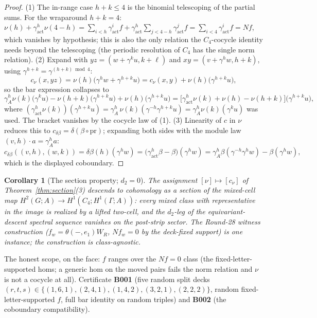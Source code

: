 \documentclass[11pt]{article}
\newtheorem{corollary}[theorem]{Corollary}
\begin{document}
\begin{proof}
(1) The in-range case $h+k\le 4$ is the binomial telescoping of the
partial sums. For the wraparound $h+k=4$:
$\nu(h)+\gamma_{\mathrm{act}}^h\nu(4-h)
=\sum_{i<h}\gamma_{\mathrm{act}}^if+\gamma_{\mathrm{act}}^h
\sum_{j<4-h}\gamma_{\mathrm{act}}^jf
=\sum_{i<4}\gamma_{\mathrm{act}}^if=Nf$, which vanishes by
hypothesis; this is also the only relation the $C_4$-cocycle identity
needs beyond the telescoping (the periodic resolution of $C_4$ has the
single norm relation). (2) Expand with
$yz=(w+\gamma^ku,k+\ell)$ and
$xy=(v+\gamma^hw,h+k)$, using
$\gamma^{h+k}=\gamma^{(h+k)\bmod 4}$:
\[
c_\nu(x,yz)=\nu(h)\bigl(\gamma^h w+\gamma^{h+k}u\bigr)
=c_\nu(x,y)+\nu(h)\bigl(\gamma^{h+k}u\bigr),
\]
so the bar expression collapses to
\[
\gamma_A^h\nu(k)\bigl(\gamma^ku\bigr)
-\nu(h+k)\bigl(\gamma^{h+k}u\bigr)+\nu(h)\bigl(\gamma^{h+k}u\bigr)
=\bigl[\gamma_{\mathrm{act}}^h\nu(k)+\nu(h)-\nu(h+k)\bigr]
\bigl(\gamma^{h+k}u\bigr),
\]
where
$(\gamma_{\mathrm{act}}^h\nu(k))(\gamma^{h+k}u)
=\gamma_A^h\,\nu(k)(\gamma^{-h}\gamma^{h+k}u)
=\gamma_A^h\nu(k)(\gamma^ku)$ was used. The bracket vanishes by the
cocycle law of (1). (3) Linearity of $c$ in $\nu$ reduces this to
$c_{\delta\beta}=\delta(\beta\circ\mathrm{pr})$; expanding both sides
with the module law $(v,h)\cdot a=\gamma_A^ha$:
\[
c_{\delta\beta}((v,h),(w,k))=\delta\beta(h)(\gamma^hw)
=\bigl(\gamma_{\mathrm{act}}^h\beta-\beta\bigr)(\gamma^hw)
=\gamma_A^h\beta(\gamma^{-h}\gamma^hw)-\beta(\gamma^hw),
\]
which is the displayed coboundary.
\end{proof}

\begin{corollary}[The section property; $d_2=0$]\label{cor:section}
The assignment $[\nu]\mapsto[c_\nu]$ of
Theorem~\ref{thm:section}(3) descends to cohomology as a
\emph{section} of the mixed-cell map
$H^2(G;A)\to H^1(C_4;H^1(\Gamma;A))$: every mixed class with
representative in the image is realized by a lifted two-cell, and the
$d_2$-leg of the equivariant-descent spectral sequence vanishes on the
post-strip sector. The Round-28 witness construction
($f_w=\theta(-,e_1)W_R$, $Nf_w=0$ by the deck-fixed support) is one
instance; the construction is class-agnostic.
\end{corollary}

The honest scope, on the face: $f$ ranges over the $Nf=0$ class (the
fixed-letter-supported homs; a generic hom on the moved pairs fails
the norm relation and $\nu$ is not a cocycle at all). Certificate
\textbf{B001} (five random split decks
$(r,t,s)\in\{(1,6,1),(2,4,1),(1,4,2),(3,2,1),(2,2,2)\}$, random
fixed-letter-supported $f$, full bar identity on random triples) and
\textbf{B002} (the coboundary compatibility).
\end{document}
